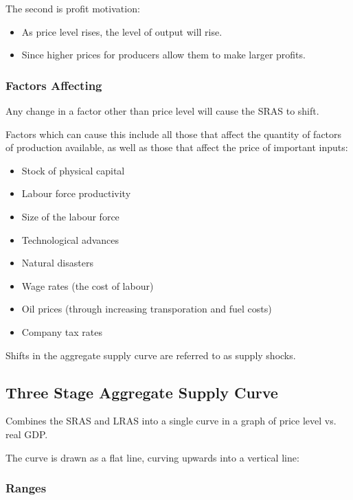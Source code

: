 \documentclass[a4paper,11pt]{report}
\begin{document}
The second is profit motivation:

\begin{itemize}
\item As price level rises, the level of output will rise.
\item Since higher prices for producers allow them to make larger profits.
\end{itemize}

\subsubsection{Factors Affecting}

Any change in a factor other than price level will cause the SRAS to shift.

Factors which can cause this include all those that affect the quantity of
factors of production available, as well as those that affect the price of
important inputs:

\begin{itemize}
\item Stock of physical capital
\item Labour force productivity
\item Size of the labour force
\item Technological advances
\item Natural disasters
\item Wage rates (the cost of labour)
\item Oil prices (through increasing transporation and fuel costs)
\item Company tax rates
\end{itemize}

Shifts in the aggregate supply curve are referred to as supply shocks.

\subsection{Three Stage Aggregate Supply Curve}

Combines the SRAS and LRAS into a single curve in a graph of price level vs.
real GDP.

The curve is drawn as a flat line, curving upwards into a vertical line:


\subsubsection{Ranges}
\end{document}
